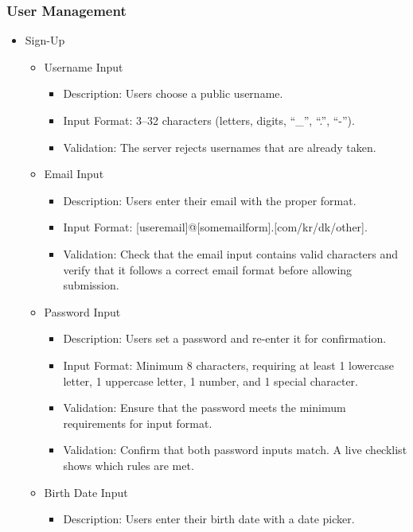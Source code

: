 \documentclass[conference]{IEEEtran}
\begin{document}
\subsubsection{User Management}
\begin{itemize}
    \item Sign-Up
    \begin{itemize}
        \item Username Input
        \begin{itemize}
            \item Description: Users choose a public username.
            \item Input Format: 3--32 characters (letters, digits, ``\_'', ``.'', ``-'').
            \item Validation: The server rejects usernames that are already taken.
        \end{itemize}
        \item Email Input
        \begin{itemize}
            \item Description: Users enter their email with the proper format.
            \item \raggedright Input Format: [useremail]@[somemailform].[com/kr/dk/other].
            \item Validation: Check that the email input contains valid characters and verify that it follows a correct email format before allowing submission.
        \end{itemize}
        \item Password Input
        \begin{itemize}
            \item Description: Users set a password and re-enter it for confirmation.
            \item Input Format: Minimum 8 characters, requiring at least 1 lowercase letter, 1 uppercase letter, 1 number, and 1 special character.
            \item Validation: Ensure that the password meets the minimum requirements for input format.
            \item Validation: Confirm that both password inputs match. A live checklist shows which rules are met.
        \end{itemize}
        \item Birth Date Input
        \begin{itemize}
            \item Description: Users enter their birth date with a date picker.

\end{itemize}
\end{itemize}
\end{itemize}
\end{document}
